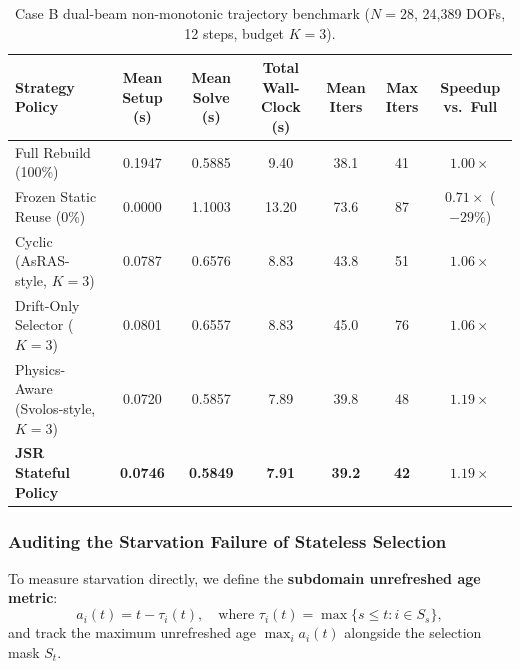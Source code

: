 \documentclass[preprint,12pt,3p]{elsarticle}
\begin{document}
\begin{table}[htbp]
\centering
\small
\caption{Case B dual-beam non-monotonic trajectory benchmark ($N=28$, 24,389 DOFs, 12 steps, budget $K=3$).}
\label{tab:case_b_dual_beam}
\begin{tabular}{lcccccc}
\toprule
\textbf{Strategy Policy} & \textbf{Mean Setup (s)} & \textbf{Mean Solve (s)} & \textbf{Total Wall-Clock (s)} & \textbf{Mean Iters} & \textbf{Max Iters} & \textbf{Speedup vs.\ Full} \\
\midrule
Full Rebuild (100\%) & 0.1947 & 0.5885 & 9.40 & 38.1 & 41 & $1.00\times$ \\
Frozen Static Reuse (0\%) & 0.0000 & 1.1003 & 13.20 & 73.6 & 87 & $0.71\times$ ($-29\%$) \\
Cyclic (AsRAS-style, $K=3$) & 0.0787 & 0.6576 & 8.83 & 43.8 & 51 & $1.06\times$ \\
Drift-Only Selector ($K=3$) & 0.0801 & 0.6557 & 8.83 & 45.0 & 76 & $1.06\times$ \\
Physics-Aware (Svolos-style, $K=3$) & 0.0720 & 0.5857 & 7.89 & 39.8 & 48 & $1.19\times$ \\
\textbf{JSR Stateful Policy} & \textbf{0.0746} & \textbf{0.5849} & \textbf{7.91} & \textbf{39.2} & \textbf{42} & $\mathbf{1.19\times}$ \\
\bottomrule
\end{tabular}
\end{table}

\subsubsection{Auditing the Starvation Failure of Stateless Selection}
To measure starvation directly, we define the \textbf{subdomain unrefreshed age metric}:
\begin{equation}
a_i(t) = t - \tau_i(t), \quad \text{where } \tau_i(t) = \max \{s \le t : i \in S_s\},
\end{equation}
and track the maximum unrefreshed age $\max_i a_i(t)$ alongside the selection mask $S_t$.
\end{document}
